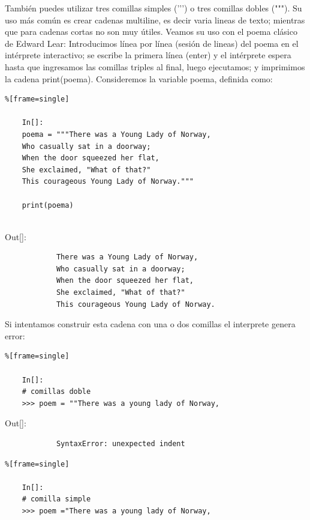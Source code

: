 También puedes utilizar tres comillas simples ('{}'{}') o tres comillas dobles ("{}"{}"). Su uso más común es crear cadenas multiline, es decir varia lineas de texto; mientras que  para cadenas cortas no son muy útiles. Veamos su uso con  el  poema clásico de Edward Lear:
Introducimos línea por línea (sesión de lineas) del poema en el intérprete interactivo;  se escribe  la primera línea (enter) y el intérprete espera hasta que ingresamos las comillas triples al final, luego ejecutamos; y imprimimos  la cadena {\ttfamily print(poema)}.
Consideremos la variable {\ttfamily poema}, definida como: 
\begin{lstlisting}%[frame=single]
	
	In[]:	
	poema = """There was a Young Lady of Norway,
	Who casually sat in a doorway;          
	When the door squeezed her flat,
	She exclaimed, "What of that?"
	This courageous Young Lady of Norway."""
	
	print(poema)
	
\end{lstlisting}

{\ttfamily\scriptsize\scriptsize 
	\hspace{-0.65cm}Out[]:\vspace{-0.15cm}	
	{\color{blue} 	
		\begin{verbatim}
			There was a Young Lady of Norway,
			Who casually sat in a doorway;          
			When the door squeezed her flat,
			She exclaimed, "What of that?"
			This courageous Young Lady of Norway.
		\end{verbatim}
}}



Si intentamos construir esta cadena con una o dos comillas el interprete genera error:

\begin{lstlisting}%[frame=single]
	
	In[]:
	# comillas doble
	>>> poem = ""There was a young lady of Norway,	
\end{lstlisting}

{\ttfamily\scriptsize\scriptsize 
	\hspace{-0.65cm}Out[]:\vspace{-0.15cm}	
	{\color{red} 	
		\begin{verbatim}		
			SyntaxError: unexpected indent
		\end{verbatim}
}}
\vspace{-0.35cm}

\begin{lstlisting}%[frame=single]
	
	In[]:
	# comilla simple	
	>>> poem ="There was a young lady of Norway,	
\end{lstlisting}

